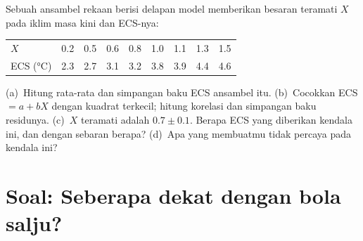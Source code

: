 \begin{exercise}[$\star\star\star$]\label{exo:b3:climate-models:12}
Sebuah ansambel rekaan berisi delapan model memberikan besaran teramati $X$
pada iklim masa kini dan ECS-nya:
\begin{center}
\begin{tabular}{l*{8}{c}}
\hline
$X$ & 0.2 & 0.5 & 0.6 & 0.8 & 1.0 & 1.1 & 1.3 & 1.5\\
ECS (\unit{\celsius}) & 2.3 & 2.7 & 3.1 & 3.2 & 3.8 & 3.9 & 4.4 & 4.6\\
\hline
\end{tabular}
\end{center}
(a)~Hitung rata-rata dan simpangan baku ECS
ansambel itu. (b)~Cocokkan ECS $= a + bX$ dengan kuadrat terkecil; hitung korelasi
dan simpangan baku residunya. (c)~$X$ teramati adalah $0.7
\pm 0.1$. Berapa ECS yang diberikan kendala ini, dan dengan sebaran berapa?
(d)~Apa yang membuatmu tidak percaya pada kendala ini?
\end{exercise}

\section{Soal: Seberapa dekat dengan bola salju?}

